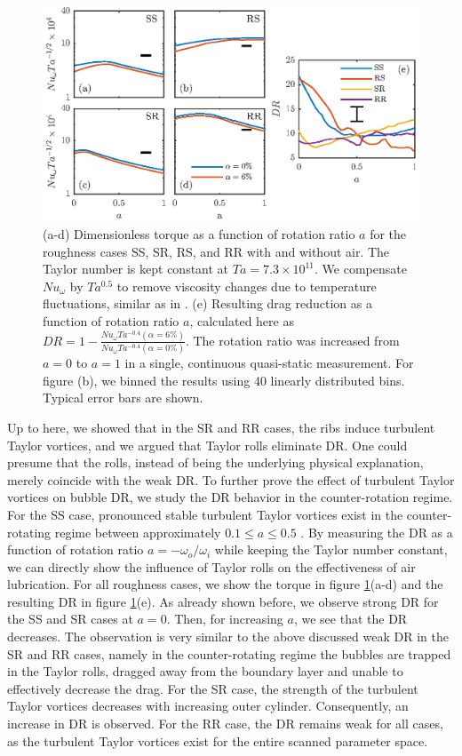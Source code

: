 \documentclass{jfm}
\newcommand{\Ta}{T\!a}
\newcommand{\Nuw}{N\!u_{\omega}}
\newcommand{\DR}{D\!R}
\begin{document}
\begin{figure}
\centering
  \includegraphics[width=1\linewidth]{fig5}
\caption{(a-d) Dimensionless torque as a function of rotation ratio $a$ for the roughness cases SS, SR, RS, and RR with and without air.  The Taylor number is kept constant at $\Ta= 7.3 \times 10^{11}$. We compensate $\Nuw$ by $\Ta^{0.5}$ to remove viscosity changes due to temperature fluctuations, similar as in \citet{hui14}. (e) Resulting drag reduction as a function of rotation ratio $a$, calculated here as $\DR =  1 - \frac{\Nuw\Ta^{-0.4}(\alpha=6\%)}{\Nuw\Ta^{-0.4}(\alpha=0\%)}$. The rotation ratio was increased from $a=0$ to $a=1$ in a single, continuous quasi-static measurement. For figure (b), we binned the results using 40 linearly distributed bins. Typical error bars are shown.}
\label{Chap_Seven_fig:torque_a}
\end{figure}

Up to here, we showed that in the SR and RR cases, the ribs induce turbulent Taylor vortices, and we argued that Taylor rolls eliminate DR. One could presume that the rolls, instead of being the underlying physical explanation, merely coincide with the weak DR. To further prove the effect of turbulent  Taylor vortices on bubble DR, we study the DR behavior in the counter-rotation regime. For the SS case, pronounced stable turbulent  Taylor vortices exist in the counter-rotating regime between approximately $0.1 \leq a \leq 0.5$ \citep{gil12,hui14, vee16b}.  By measuring the DR as a function of rotation ratio $a=-\omega_o/\omega_i$ while keeping the Taylor number constant, we can directly show the influence of Taylor rolls on the effectiveness of air lubrication. 
For all roughness cases, we show the torque in figure \ref{Chap_Seven_fig:torque_a}(a-d) and the resulting DR in figure \ref{Chap_Seven_fig:torque_a}(e). As already shown before, we observe strong DR for the SS and SR cases at $a=0$. Then, for increasing $a$, we see that the DR decreases. The observation is very similar to the above discussed weak DR in the SR and RR cases, namely in the counter-rotating regime the bubbles are trapped in the Taylor rolls, dragged away from the boundary layer and unable to effectively decrease the drag. For the SR case, the strength of the turbulent Taylor vortices decreases with increasing outer cylinder. Consequently, an increase in DR is observed. For the RR case, the DR remains weak for all cases, as the turbulent Taylor vortices exist for the entire scanned parameter space.
\end{document}
